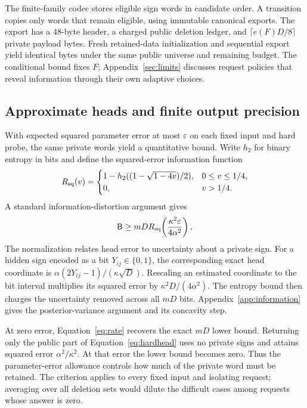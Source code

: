 The finite-family codec stores eligible sign words in candidate order.
A transition copies only words that remain eligible, using immutable
canonical exports. The export has a 48-byte header, a charged public
deletion ledger, and $\lceil e(F)D/8\rceil$ private payload bytes.
Fresh retained-data initialization and sequential export yield identical
bytes under the same public universe and remaining budget. The conditional
bound fixes $F$; Appendix~\ref{sec:limits} discusses request policies that
reveal information through their own adaptive choices.

\subsection{Approximate heads and finite output precision}

With expected squared parameter error at most $\varepsilon$ on each fixed
input and hard probe, the same private words yield a quantitative bound. Write $h_2$ for binary
entropy in bits and define the squared-error information function
\[
 R_{\rm sq}(v)=
 \begin{cases}
 1-h_2((1-\sqrt{1-4v})/2),&0\le v\le1/4,\\
 0,&v>1/4.
 \end{cases}
\]
A standard information-distortion argument \citep{shannon} gives
\begin{equation}\label{eq:rate}
 \mathsf B\ge mD R_{\rm sq}\!\left(\frac{\kappa^2\varepsilon}{4\alpha^2}\right),
\end{equation}
The normalization relates head error to uncertainty about a private sign.
For a hidden sign encoded as a bit $Y_{ij}\in\{0,1\}$, the corresponding
exact head coordinate is $\alpha(2Y_{ij}-1)/(\kappa\sqrt D)$.
Rescaling an estimated coordinate to the bit interval multiplies its
squared error by $\kappa^2D/(4\alpha^2)$. The entropy bound then charges
the uncertainty removed across all $mD$ bits. Appendix~\ref{app:information}
gives the posterior-variance argument and its concavity step.

At zero error, Equation~\eqref{eq:rate} recovers the exact $mD$ lower
bound. Returning only the public part of Equation~\eqref{eq:hardhead}
uses no private signs and attains squared error $\alpha^2/\kappa^2$.
At that error the lower bound becomes zero. Thus the parameter-error
allowance controls how much of the private word must be retained.
The criterion applies to every fixed input and isolating request;
averaging over all deletion sets would dilute the difficult cases among
requests whose answer is zero.

